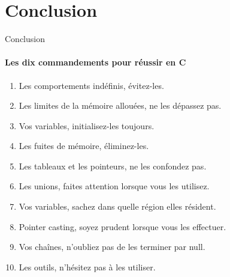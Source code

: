 \section{Conclusion}
\begin{frame}{Conclusion}
	\framesubtitle{Les dix commandements pour réussir en C}
	\begin{enumerate}
		\item \alert{Les comportements indéfinis}, évitez-les.
		\item \alert{Les limites de la mémoire allouées}, ne les dépassez pas.
		\item \alert{Vos variables}, initialisez-les toujours.
		\item \alert{Les fuites de mémoire}, éliminez-les.
		\item \alert{Les tableaux et les pointeurs}, ne les confondez pas.
		\item \alert{Les unions}, faites attention lorsque vous les utilisez.
		\item \alert{Vos variables}, sachez dans quelle région elles résident.
		\item \alert{Pointer casting}, soyez prudent lorsque vous les effectuer.
		\item \alert{Vos chaînes}, n'oubliez pas de les terminer par null.
		\item \alert{Les outils}, n'hésitez pas à les utiliser.
	\end{enumerate}
\end{frame}